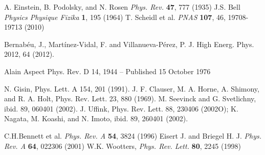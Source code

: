 \begin{thebibliography}{}

 A. Einstein, B. Podolsky, and N. Rosen \textit{Phys. Rev.} \textbf{47}, 777 (1935)
 J.S. Bell \textit{Physics Physique Fizika} \textbf{1}, 195 (1964)
 T. Scheidl et al. \textit{PNAS} \textbf{107}, 46, 19708-19713 (2010)

 Bernabéu, J., Martínez-Vidal, F. and Villanueva-Pérez, P. J. High Energ. Phys. 2012, 64 (2012).

 Alain Aspect Phys. Rev. D 14, 1944 – Published 15 October 1976

 N. Gisin, Phys. Lett. A 154, 201 (1991).
 J. F. Clauser, M. A. Horne, A. Shimony, and R. A. Holt, Phys. Rev. Lett. 23, 880 (1969).
 M. Seevinck and G. Svetlichny, ibid. 89, 060401 (2002).
  J. Uffink, Phys. Rev. Lett. 88, 230406 (2002O); K. Nagata, M. Koashi, and N. Imoto, ibid. 89, 260401 (2002).
% 

 C.H.Bennett et al. \textit{Phys. Rev. A} \textbf{54}, 3824 (1996)
 Eisert J. and Briegel H. J. \textit{Phys. Rev. A} \textbf{64}, 022306 (2001)
 W.K. Wootters, \textit{Phys. Rev. Lett.} \textbf{80}, 2245 (1998) 



\end{thebibliography}
